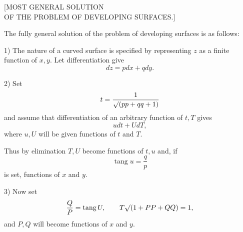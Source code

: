 \clearpage
{}
\begin{center}\large [MOST GENERAL SOLUTION\\OF THE PROBLEM OF DEVELOPING SURFACES.]\end{center}
\noindent\hspace*{1.2em}The fully general solution of the problem of developing surfaces is as follows:

1) The nature of a curved surface is specified by representing $z$ as a finite function of $x,y$. Let differentiation give
\[
dz=pdx+qdy.
\]

2) Set
\[
t=\frac{1}{\mathord{\surd}(pp+qq+1)}
\]
\noindent and assume that differentiation of an arbitrary function of $t,T$ gives
\[
udt+UdT,
\]
\noindent where $u,U$ will be given functions of $t$ and $T$.

Thus by elimination $T,U$ become functions of $t,u$ and, if
\[
\operatorname{tang}u=\frac{q}{p}
\]
\noindent is set, functions of $x$ and $y$.

3) Now set
\[
\frac{Q}{P}=\operatorname{tang}U,\qquad
T\mathord{\surd}(1+PP+QQ)=1,
\]
\noindent and $P,Q$ will become functions of $x$ and $y$.


